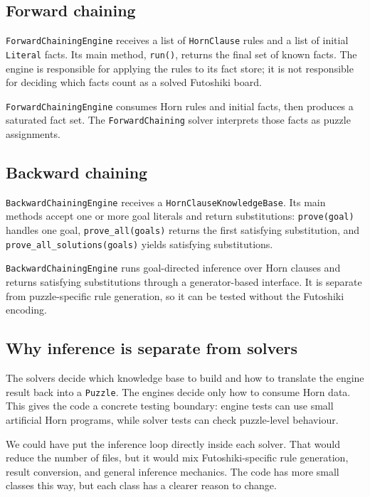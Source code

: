 \documentclass[11pt]{article}
\begin{document}
\subsection{Forward chaining}

\texttt{ForwardChainingEngine} receives a list of \texttt{HornClause} rules and
a list of initial \texttt{Literal} facts. Its main method,
\texttt{run()}, returns the final set of known facts. The engine is responsible
for applying the rules to its fact store; it is not responsible for deciding
which facts count as a solved Futoshiki board.

\texttt{ForwardChainingEngine} consumes Horn rules and initial facts, then
produces a saturated fact set. The \texttt{ForwardChaining} solver interprets
those facts as puzzle assignments.

\subsection{Backward chaining}

\texttt{BackwardChainingEngine} receives a
\texttt{HornClauseKnowledgeBase}. Its main methods accept one or more goal
literals and return substitutions: \texttt{prove(goal)} handles one goal,
\texttt{prove\_all(goals)} returns the first satisfying substitution, and
\texttt{prove\_all\_solutions(goals)} yields satisfying substitutions.

\texttt{BackwardChainingEngine} runs goal-directed inference over Horn clauses
and returns satisfying substitutions through a generator-based interface. It is
separate from puzzle-specific rule generation, so it can be tested without the
Futoshiki encoding.

\subsection{Why inference is separate from solvers}

The solvers decide which knowledge base to build and how to translate the
engine result back into a \texttt{Puzzle}. The engines decide only how to
consume Horn data. This gives the code a concrete testing boundary: engine
tests can use small artificial Horn programs, while solver tests can check
puzzle-level behaviour.

We could have put the inference loop directly inside each solver. That would
reduce the number of files, but it would mix Futoshiki-specific rule
generation, result conversion, and general inference mechanics. The code has
more small classes this way, but each class has a clearer reason to change.
\end{document}
